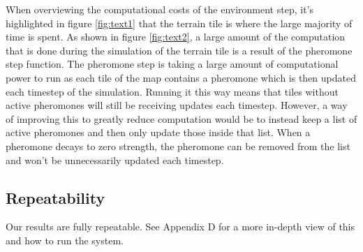 When overviewing the computational costs of the environment step, it's highlighted in figure \ref{fig:text1} that the terrain tile is where the large majority of time is spent. As shown in figure \ref{fig:text2}, a large amount of the computation that is done during the simulation of the terrain tile is a result of the pheromone step function. The pheromone step is taking a large amount of computational power to run as each tile of the map contains a pheromone which is then updated each timestep of the simulation. Running it this way means that tiles without active pheromones will still be receiving updates each timestep. However, a way of improving this to greatly reduce computation would be to instead keep a list of active pheromones and then only update those inside that list. When a pheromone decays to zero strength, the pheromone can be removed from the list and won't be unnecessarily updated each timestep.\par

\subsection{Repeatability}
Our results are fully repeatable. See Appendix D for a more in-depth view of this and how to run the system.\par
